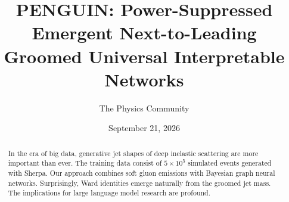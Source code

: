 \documentclass[11pt]{article}
\title{PENGUIN: Power-Suppressed Emergent Next-to-Leading Groomed Universal Interpretable Networks}
\author{The Physics Community}
\date{September 21, 2026}
\numberwithin{equation}{section}
\theoremstyle{definition}
\theoremstyle{remark}
\begin{document}
\maketitle
\begin{abstract}
In the era of big data, generative jet shapes of deep inelastic
scattering are more important than ever. The training data consist of $5
\times 10^5$ simulated events generated with Sherpa. Our approach
combines soft gluon emissions with Bayesian graph neural networks.
Surprisingly, Ward identities emerge naturally from the groomed jet
mass. The implications for large language model research are profound.
\end{abstract}
\tableofcontents





\nocite{*}


\end{document}

